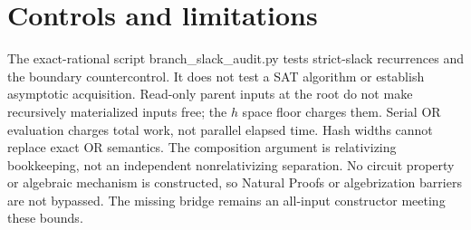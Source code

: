 \documentclass{article}
\begin{document}
\section{Controls and limitations}
The exact-rational script branch\_slack\_audit.py tests strict-slack
recurrences and the boundary countercontrol. It does not test a SAT
algorithm or establish asymptotic acquisition. Read-only parent inputs
at the root do not make recursively materialized inputs free; the $h$
space floor charges them. Serial OR evaluation charges total work, not
parallel elapsed time. Hash widths cannot replace exact OR semantics.
The composition argument is relativizing bookkeeping, not an independent
nonrelativizing separation. No circuit property or algebraic mechanism
is constructed, so Natural Proofs or algebrization barriers are not bypassed.
The missing bridge remains an all-input constructor meeting these bounds.
\end{document}
